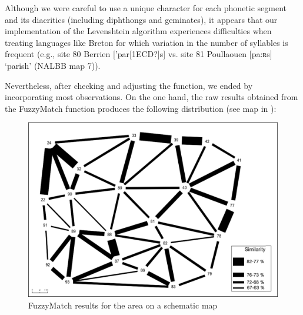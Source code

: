 \documentclass[output=paper]{LSP/langsci}
\begin{document}
\begin{table}
\caption{Examples of the difficulties encountered by LD for the concept 'that one (masc.)'}
\label{tab:3}
\end{table}

Although we were careful to use a unique character for each phonetic segment and its diacritics (including diphthongs and geminates), it appears that our implementation of the Levenshtein algorithm experiences difficulties when treating languages like Breton for which variation in the number of syllables is frequent (e.g., site 80 Berrien ['par[1ECD?]s] vs. site 81 Poullaouen [pa:ʀs] ‘parish’ (NALBB map 7)).

Nevertheless, after checking and adjusting the function, we ended by incorporating most observations. On the one hand, the raw results obtained from the FuzzyMatch function produces the following distribution (see map in ):

\begin{figure}
\includegraphics[width=\textwidth]{illustrations/brun_etal_fig3}
\caption{\textup{FuzzyMatch results for the area on a schematic map}}
\label{fig:3}
\end{figure}
\end{document}

